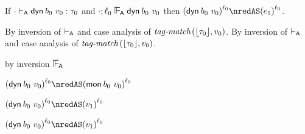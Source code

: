 \begin{lemma}\label{A-dyn-label-progress}
  If\/ ${\cdot} \vdash_{\mathsf{A}} \mathsf{dyn}^{}\,b_0~v_0 : \tau_0$
  and\/ $\snil; \sowner_0 \sWLA \edynb{\sbnd_0}{\svalue_0}$
  then\/ $\obars{\edynb{\sbnd_0}{\svalue_0}}{\sowner_0} \nredAS \obars{\sexpr_1}{\sowner_0}$.
\end{lemma}{
  \newcommand{\shortproof}{By inversion of $\sWTA$ and case analysis of $\fshallow{\tagof{\stype_0}}{\svalue_0}$.}
\begin{lamportproof*}
  \shortproof
\mainproof
  \shortproof

    \begin{pfproof}
      by inversion $\sWLA$
    \end{pfproof}

    \begin{pfproof}
      \qedstep
        \begin{pfproof}
          $\obars{\edynb{\sbnd_0}{\svalue_0}}{\sowner_0} \nredAS \obars{\emon{\sbnd_0}{\svalue_0}}{\sowner_0}$
        \end{pfproof}
    \end{pfproof}

    \begin{pfproof}
      \qedstep
        \begin{pfproof}
          $\obars{\edynb{\sbnd_0}{\svalue_0}}{\sowner_0} \nredAS \obars{\svalue_1}{\sowner_0}$
        \end{pfproof}
    \end{pfproof}

    \begin{pfproof}
      \qedstep
        \begin{pfproof}
          $\obars{\edynb{\sbnd_0}{\svalue_0}}{\sowner_0} \nredAS \obars{\svalue_1}{\sowner_0}$
        \end{pfproof}
    \end{pfproof}


\end{lamportproof*}}
